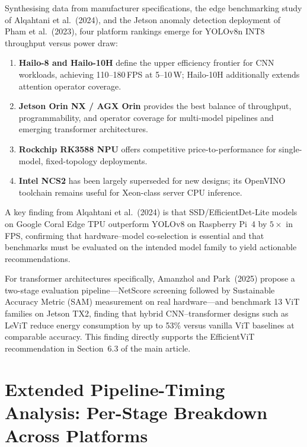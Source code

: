 \documentclass[11pt,a4paper]{article}
\begin{document}
Synthesising data from manufacturer specifications, the edge
benchmarking study of Alqahtani et al.\ (2024), and the Jetson
anomaly detection deployment of Pham et al.\ (2023), four platform
rankings emerge for YOLOv8n INT8 throughput versus power draw:

\begin{enumerate}[leftmargin=*, noitemsep]
  \item \textbf{Hailo-8 and Hailo-10H} define the upper efficiency
    frontier for CNN workloads, achieving 110--180\,FPS at 5--10\,W;
    Hailo-10H additionally extends attention operator coverage.
  \item \textbf{Jetson Orin NX / AGX Orin} provides the best balance
    of throughput, programmability, and operator coverage for
    multi-model pipelines and emerging transformer architectures.
  \item \textbf{Rockchip RK3588 NPU} offers competitive
    price-to-performance for single-model, fixed-topology deployments.
  \item \textbf{Intel NCS2} has been largely superseded for new
    designs; its OpenVINO toolchain remains useful for Xeon-class
    server CPU inference.
\end{enumerate}

A key finding from Alqahtani et al.\ (2024) is that
SSD/EfficientDet-Lite models on Google Coral Edge TPU outperform
YOLOv8 on Raspberry Pi~4 by $5{\times}$ in FPS, confirming that
hardware--model co-selection is essential and that benchmarks must
be evaluated on the intended model family to yield actionable
recommendations.

For transformer architectures specifically, Amanzhol and
Park~(2025) propose a two-stage evaluation pipeline---NetScore
screening followed by Sustainable Accuracy Metric (SAM) measurement
on real hardware---and benchmark 13 ViT families on Jetson TX2,
finding that hybrid CNN--transformer designs such as LeViT reduce
energy consumption by up to 53\% versus vanilla ViT baselines at
comparable accuracy. This finding directly supports the EfficientViT
recommendation in Section~6.3 of the main article.

\section{Extended Pipeline-Timing Analysis: Per-Stage Breakdown
         Across Platforms}
\label{sec:pipeline_timing_extended} 
\end{document}
